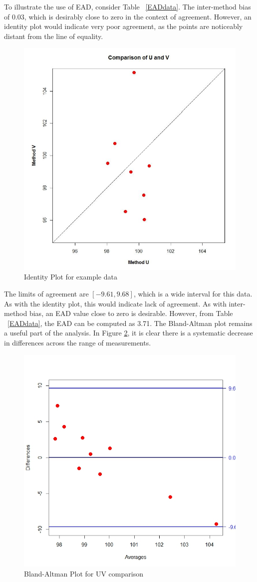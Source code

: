 \documentclass[12pt, a4paper]{report}
\theoremstyle{plain}
\theoremstyle{definition}
\theoremstyle{remark}
\begin{document}
To illustrate the use of EAD, consider Table ~\ref{EADdata}. The inter-method bias of 0.03, which is desirably close to zero in the context of agreement. However, an identity plot would indicate very poor agreement, as the points are noticeably distant from the line of equality.
\begin{figure}
	\centering
	\includegraphics[width=0.5\linewidth]{EAD-UV}
	\caption{Identity Plot for example data}
	\label{fig:EADidentity}
\end{figure}

The limits of agreement are $[-9.61, 9.68]$, which is a wide interval for this data. As with the identity plot, this would indicate lack of agreement. As with inter-method bias, an EAD value close to zero is desirable. However, from Table ~\ref{EADdata}, the EAD can be computed as 3.71. The Bland-Altman plot remains a useful part of the analysis. In Figure \ref{fig:EAD1}, it is clear there is a systematic decrease in differences across the range of measurements.
\begin{figure}[h!]
	\centering
	\includegraphics[width=0.55\linewidth]{images/EAD1}
	\caption{Bland-Altman Plot for UV comparison}
	\label{fig:EAD1}
\end{figure}
\end{document}
